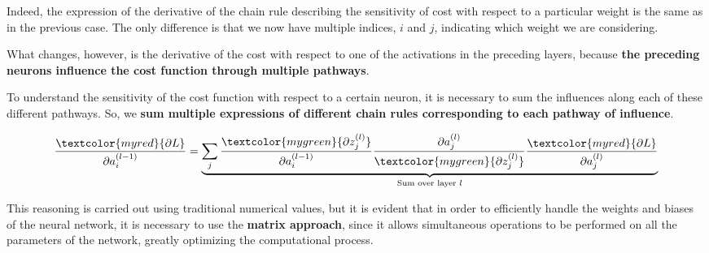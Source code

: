 Indeed, the expression of the derivative of the chain rule describing the sensitivity of cost with respect to a particular weight is the same as in the previous case. The only difference is that we now have multiple indices, $i$ and $j$, indicating which weight we are considering.

What changes, however, is the derivative of the cost with respect to one of the activations in the preceding layers, because \textbf{the preceding neurons influence the cost function through multiple pathways}.

To understand the sensitivity of the cost function with respect to a certain neuron, it is necessary to sum the influences along each of these different pathways. So, we \textbf{sum multiple expressions of different chain rules corresponding to each pathway of influence}.

\vspace{-0.5cm}
$$\frac{\textcolor{myred}{\partial L}}{\partial a_{i}^{(l-1)}} = \underbrace{\sum_{j}\frac{\textcolor{mygreen}{\partial z_{j}^{(l)}}}{\partial a_{i}^{(l-1)}}  \frac{\partial a_{j}^{(l)}}{\textcolor{mygreen}{\partial z_{j}^{(l)}}} \frac{\textcolor{myred}{\partial L}}{\partial a_{j}^{(l)}}}_\textrm{Sum over layer $l$}$$

This reasoning is carried out using traditional numerical values, but it is evident that in order to efficiently handle the weights and biases of the neural network, it is necessary to use the \textbf{matrix approach}, since it allows simultaneous operations to be performed on all the parameters of the network, greatly optimizing the computational process.

